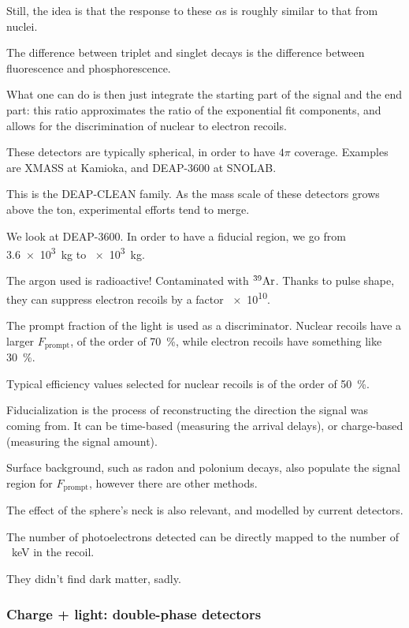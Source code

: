 \documentclass[main.tex]{subfiles}
\begin{document}
Still, the idea is that the response to these \(\alpha \)s is roughly similar to that from nuclei. 

The difference between triplet and singlet decays is the difference between fluorescence
and phosphorescence. 

What one can do is then just integrate the starting part of the signal and the end part: 
this ratio approximates the ratio of the exponential fit components, and 
allows for the discrimination of nuclear to electron recoils. 

These detectors are typically spherical, in order to have \(4 \pi \) coverage. 
Examples are XMASS at Kamioka, and DEAP-3600 at SNOLAB. 

This is the DEAP-CLEAN family. 
As the mass scale of these detectors grows above the ton, experimental efforts 
tend to merge. 

We look at DEAP-3600. In order to have a fiducial region, we go from \SI{3.6e3}{kg} to 
\SI{e3}{kg}. 

The argon used is radioactive! Contaminated with \(^{39}\ce{Ar}\). 
Thanks to pulse shape, they can suppress electron recoils by a factor \num{e10}. 


The prompt fraction of the light is used as a discriminator. 
Nuclear recoils have a larger \(F _{\text{prompt}}\), of the order of \SI{70}{\percent},
while electron recoils have something like \SI{30}{\percent}. 

Typical efficiency values selected for nuclear recoils is of the order of \SI{50}{\percent}. 

Fiducialization is the process of reconstructing the direction the signal was coming from.
It can be time-based (measuring the arrival delays), or charge-based (measuring the signal amount).

Surface background, such as radon and polonium decays, also populate the signal region for \(F _{\text{prompt}}\), however there are other methods.

The effect of the sphere's neck is also relevant, and modelled by current detectors.

The number of photoelectrons detected can be directly mapped to the number of \SI{}{keV} in the recoil. 

They didn't find dark matter, sadly.

\subsubsection{Charge + light: double-phase detectors}
\end{document}
